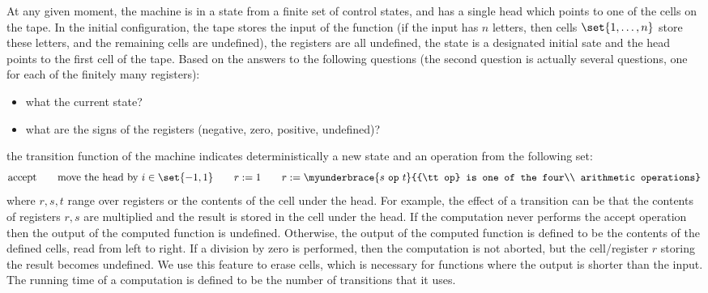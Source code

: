 At any given moment, the machine  is in a state  from a finite set of control states, and has a single head which points to one of the cells on the tape. In the initial configuration,  the tape stores the input of the function (if the input has $n$ letters, then cells $\set{1,\ldots,n}$ store these letters, and the remaining cells are undefined), the registers are all undefined, the state is a  designated initial sate and the head points to the first cell of the tape. Based on the answers to the following questions (the second question is actually several questions, one for each of the finitely many registers):
\begin{itemize}
	\item what  the current state?
	\item what are the signs of the registers (negative, zero, positive, undefined)?
\end{itemize}
the transition function of the machine indicates deterministically a new state and  an operation from the following set:
\begin{align*}
\text{accept} \qquad \text{move the head by } i \in \set{-1,1} \qquad   r := 1 \qquad  r := \myunderbrace{s\  \mathtt{op}\  t}{{\tt op} is one of the four\\ arithmetic operations}
\end{align*}
where  $r,s,t$ range over registers or the contents of the cell under the head. For example, the effect of a transition can be that the contents of registers $r,s$ are multiplied and the result is stored in the cell under the head. If the computation never performs the accept operation  then  the output of the computed  function is undefined. Otherwise, the output of the computed function is defined to be the contents of the defined cells, read from left to right. If a division by zero is performed, then the computation is  not aborted, but the cell/register $r$ storing the result becomes undefined.  We use this feature to erase cells, which is necessary for functions where the  output is shorter than the input. The running time of a computation is defined to be the number of transitions that it uses.



